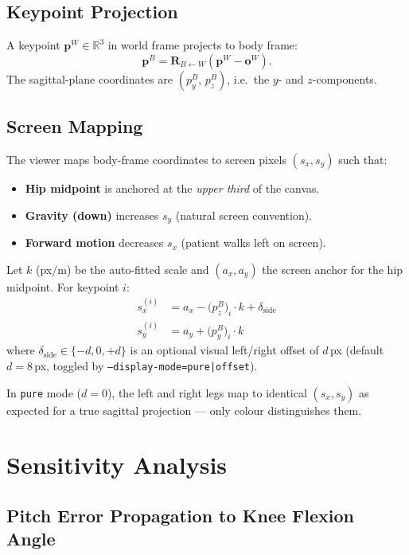 \documentclass[11pt, a4paper]{article}
\newcommand{\R}{\mathbb{R}}
\newcommand{\vv}[1]{\bm{#1}}          %
\newcommand{\mat}[1]{\mathbf{#1}}     %
\newcommand{\Rtrans}[2]{\mat{R}_{#1 \leftarrow #2}}  %
\theoremstyle{definition}
\begin{document}
\subsection{Keypoint Projection}

A keypoint $\vv{p}^W \in \R^3$ in world frame projects to body frame:
\[
  \vv{p}^B = \Rtrans{B}{W}\!\left(\vv{p}^W - \vv{o}^W\right).
\]
The sagittal-plane coordinates are $(p^B_y,\, p^B_z)$, i.e.\ the $y$- and
$z$-components.

\subsection{Screen Mapping}

The viewer maps body-frame coordinates to screen pixels $(s_x, s_y)$ such that:
\begin{itemize}[noitemsep]
  \item \textbf{Hip midpoint} is anchored at the \emph{upper third} of the canvas.
  \item \textbf{Gravity (down)} increases $s_y$ (natural screen convention).
  \item \textbf{Forward motion} decreases $s_x$ (patient walks left on screen).
\end{itemize}
Let $k$ (px/m) be the auto-fitted scale and $(a_x, a_y)$ the screen anchor for
the hip midpoint. For keypoint $i$:
\begin{align}
  s_x^{(i)} &= a_x - \bigl(p^B_z\bigr)_i \cdot k + \delta_{\mathrm{side}} \label{eq:sx}\\
  s_y^{(i)} &= a_y + \bigl(p^B_y\bigr)_i \cdot k \label{eq:sy}
\end{align}
where $\delta_{\mathrm{side}} \in \{-d, 0, +d\}$ is an optional visual
left/right offset of $d$\,px (default $d = 8$\,px, toggled by
\texttt{--display-mode=pure|offset}).

In \texttt{pure} mode ($d = 0$), the left and right legs map to identical
$(s_x, s_y)$ as expected for a true sagittal projection ---
only colour distinguishes them.

\section{Sensitivity Analysis}

\subsection{Pitch Error Propagation to Knee Flexion Angle}
\end{document}
